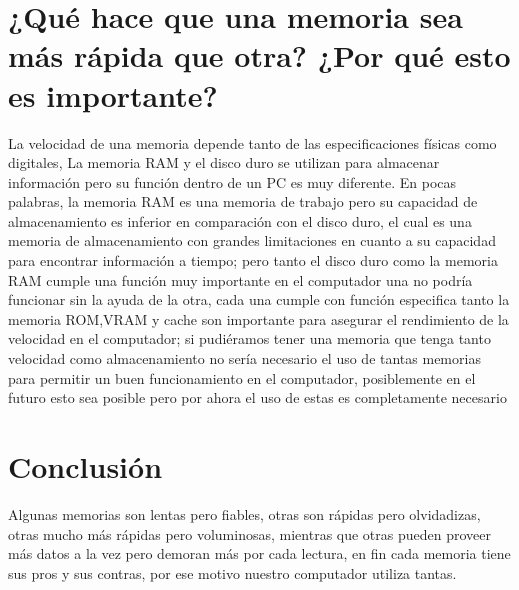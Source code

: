 \documentclass[12pt]{report}
\begin{document}
\section{¿Qué hace que una memoria sea más rápida que otra? ¿Por qué esto es importante?}

La velocidad de una memoria depende tanto de las especificaciones físicas como digitales, La memoria RAM y el disco duro se utilizan para almacenar información pero su función dentro de un PC es muy diferente. En pocas palabras, la memoria RAM es una memoria de trabajo pero su capacidad de almacenamiento es inferior en comparación con el disco duro, el cual es una memoria de almacenamiento con grandes limitaciones en cuanto a su capacidad para encontrar información a tiempo; pero tanto el disco duro como la memoria RAM cumple una función muy importante en el computador una no podría funcionar sin la ayuda de la otra, cada una cumple con función especifica tanto la memoria ROM,VRAM y cache son importante para asegurar el rendimiento de la velocidad en el computador; si pudiéramos tener una memoria que tenga  tanto velocidad como almacenamiento no sería necesario el uso de tantas memorias  para permitir un buen funcionamiento en el computador, posiblemente en el futuro esto sea posible pero por ahora el uso de estas es completamente necesario



\section{Conclusión} \label{conclulsion}
Algunas memorias son lentas pero fiables, otras son rápidas pero olvidadizas, otras mucho más rápidas pero voluminosas, mientras que otras pueden proveer más datos a la vez pero demoran más por cada lectura, en fin cada memoria tiene sus pros y sus contras, por ese motivo nuestro computador  utiliza tantas.



\newpage



\end{document}
